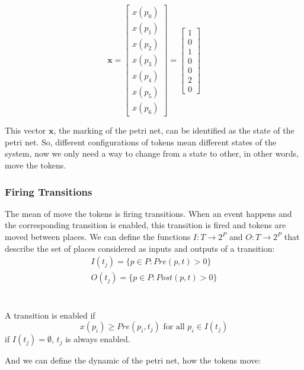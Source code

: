 \begin{equation*}
\mathbf{x}=\begin{bmatrix}
  x(p_0)\\
  x(p_1)\\
  x(p_2)\\
  x(p_3)\\
  x(p_4)\\
  x(p_5)\\
  x(p_6)
\end{bmatrix} =
\begin{bmatrix}
  1\\
  0\\
  1\\
  0\\
  0\\
  2\\
  0
\end{bmatrix}
\end{equation*}

This vector $\mathbf{x}$, the marking of the petri net, can be identified as the
state of the petri net. So, different configurations of tokens mean different
states of the system, now we only need a way to change from a state to other, in
other words, move the tokens.

\subsubsection{Firing Transitions}
\label{sec:firingTransitions}
The mean of move the tokens is firing transitions. When an event  happens and
the corresponding transition is enabled, this transition is fired and tokens
are moved between places.
We can define the functions $I : T \rightarrow 2^P$ and $O : T \rightarrow 2^P$ that
describe the set of places considered as inputs and outputs of a transition: 
\begin{align*}
  I(t_j)= \{p \in P : Pre(p,t)> 0\}\\
  O(t_j)= \{p \in P : Post(p,t)> 0\}\\
\end{align*}
\pagebreak
\begin{definition}
  \label{def:enabledTransition}~\\
  A transition is enabled if
  \[ x(p_i)\geq Pre(p_i,t_j) \text{ for all }{p_i \in I(t_j)}\]
  if $I(t_j)=\emptyset$, $t_j$ is always enabled. 
\end{definition}

And we can define the dynamic of the petri net, how the tokens move: 

